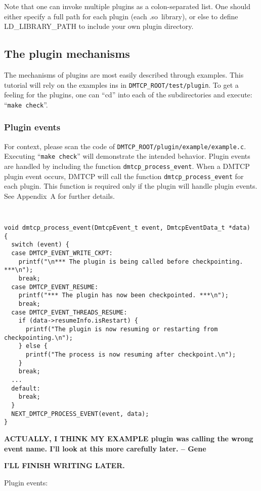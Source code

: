 \documentclass{article}
\begin{document}
Note that one can invoke multiple plugins as a colon-separated list.
One should either specify a full path for each plugin (each .so~library),
or else to define LD\_LIBRARY\_PATH to include your own plugin directory.

\subsection{The plugin mechanisms}

The mechanisms of plugins are most easily described through examples.
This tutorial will rely on the examples ins in {\tt DMTCP\_ROOT/test/plugin}.
To get a feeling for the plugins, one can ``cd'' into each of the
subdirectories and execute: ``{\tt make check}''.

\subsubsection{Plugin events}

For context, please scan the code of {\tt DMTCP\_ROOT/plugin/example/example.c}.
Executing ``{\tt make check}'' will demonstrate the intended behavior.
Plugin events are handled by including the function {\tt dmtcp\_process\_event}.
When a DMTCP plugin event occurs, DMTCP will call the
function {\tt dmtcp\_process\_event} for each plugin.
This function is required only if the plugin will handle plugin events.
See Appendix~A for further details.

{\tt
\begin{verbatim}
void dmtcp_process_event(DmtcpEvent_t event, DmtcpEventData_t *data)
{
  switch (event) {
  case DMTCP_EVENT_WRITE_CKPT:
    printf("\n*** The plugin is being called before checkpointing. ***\n");
    break;
  case DMTCP_EVENT_RESUME:
    printf("*** The plugin has now been checkpointed. ***\n");
    break;
  case DMTCP_EVENT_THREADS_RESUME:
    if (data->resumeInfo.isRestart) {
      printf("The plugin is now resuming or restarting from checkpointing.\n");
    } else {
      printf("The process is now resuming after checkpoint.\n");
    }
    break;
  ...
  default:
    break;
  }
  NEXT_DMTCP_PROCESS_EVENT(event, data);
}
\end{verbatim}
}

{\bf ACTUALLY, I THINK MY
  EXAMPLE plugin was calling the wrong event name.  I'll look at this
  more carefully later. -- Gene}

{\bf I'LL FINISH WRITING LATER.}


Plugin events:
\end{document}
